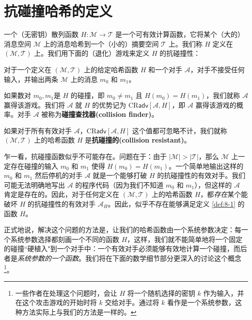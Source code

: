 \section{抗碰撞哈希的定义}\label{sec:8-1}

一个（无密钥）散列函数 $H:\mathcal{M}\to\mathcal{T}$ 是一个可有效计算函数，它将某个（大的）消息空间 $\mathcal{M}$ 上的消息哈希到一个（小的）摘要空间 $\mathcal{T}$ 上。我们称 $H$ 定义在 $(\mathcal{M},\mathcal{T})$ 上。我们用下面的（退化）游戏来定义 $H$ 的抗碰撞性：
\begin{game}[抗碰撞性]\label{game:8-1}
对于一个定义在 $(\mathcal{M},\mathcal{T})$ 上的给定哈希函数 $H$ 和一个对手 $\mathcal{A}$，对手不接受任何输入，并输出两条 $\mathcal{M}$ 上的消息 $m_0$ 和 $m_1$。

如果数对 $m_0, m_1$是 $H$ 的碰撞，即 $m_0\neq m_1$ 且 $H(m_0)=H(m_1)$，我们就称 $\mathcal{A}$ 赢得该游戏。我们将 $\mathcal{A}$ 就 $H$ 的优势记为 $\mathrm{CR}\mathsf{adv}[\mathcal{A},H]$，即 $\mathcal{A}$ 赢得该游戏的概率。对手 $\mathcal{A}$ 被称为\textbf{碰撞查找器(collision finder)}。
\end{game}

\begin{definition}\label{def:8-1}
如果对于所有有效对手 $\mathcal{A}$，$\mathrm{CR}\mathsf{adv}[\mathcal{A},H]$ 这个值都可忽略不计，我们就称 $(\mathcal{M},\mathcal{T})$ 上的哈希函数 $H$ 是\textbf{抗碰撞的(collision resistant)}。
\end{definition}

乍一看，抗碰撞函数似乎不可能存在。问题在于：由于 $|\mathcal{M}|>|\mathcal{T}|$，那么 $\mathcal{M}$ 上一定存在碰撞的输入 $m_0$ 和 $m_1$ 使得 $H(m_0)=H(m_1)$。一个简单地输出这样的 $m_0$ 和 $m_1$ 然后停机的对手 $\mathcal{A}$ 就是一个能够打破 $H$ 的抗碰撞性的有效对手。我们可能无法明确地写出 $\mathcal{A}$ 的程序代码（因为我们不知道 $m_0$ 和 $m_1$），但这样的 $\mathcal{A}$ 肯定是存在的。因此，对于任何定义在 $(\mathcal{M},\mathcal{T})$ 上的哈希函数 $H$，都\emph{存在}某个能破坏 $H$ 的抗碰撞性的有效对手 $\mathcal{A}_H$。因此，似乎不存在能够满足定义 \ref{def:8-1} 的函数 $H$。

正式地说，解决这个问题的方法是，让我们的哈希函数由一个系统参数决定：每一个系统参数选择都刻画一个不同的函数 $H$，这样，我们就不能简单地将一个固定的碰撞``硬植入"到一个对手中：一个有效对手必须能够有效地计算一个碰撞，而后者是\emph{系统参数的一个函数}。我们将在下面的数学细节部分更深入的讨论这个概念\footnote{一些作者在处理这个问题时，会让 $H$ 将一个随机选择的密钥 $k$ 作为输入，并在这个攻击游戏的开始时将 $k$ 交给对手。通过将 $k$ 看作是一个系统参数，这种方法实际上与我们的方法是一样的。}。

